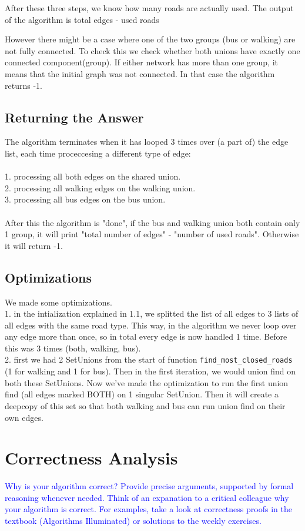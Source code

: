 \documentclass[a4paper]{article}
\newcommand{\instruction}[1]{\textcolor{blue}{#1}}
\begin{document}
After these three steps, we know how many roads are actually used.
The output of the algorithm is total edges - used roads

However there might be a case where one of the two groups (bus or walking) are not fully connected.
To check this we check whether both unions have exactly one connected component(group).
If either network has more than one group, it means that the initial graph was not connected.
In that case the algorithm returns -1.


\subsection{Returning the Answer}
The algorithm terminates when it has looped 3 times over (a part of) the edge list, each time proceccesing a different type of edge:
\\
\\
1. processing all both edges on the shared union.
\\
2. processing all walking edges on the walking union.
\\
3. processing all bus edges on the bus union.
\\
\\
After this the algorithm is "done", if the bus and walking union both contain only 1 group, it will print "total number of edges" - "number of used roads". Otherwise it will return -1.
\subsection{Optimizations}
We made some optimizations.\\1. in the intialization explained in 1.1, we splitted the list of all edges to 3 lists of all edges with the same road type. This way, in the algorithm we never loop over any edge more than once, so in total every edge is now handled 1 time. Before this was 3 times (both, walking, bus).
\\2. first we had 2 SetUnions from the start of function \texttt{find\_most\_closed\_roads} (1 for walking and 1 for bus). Then in the first iteration, we would union find on both these SetUnions. Now we've made the optimization to run the first union find (all edges marked BOTH) on 1 singular SetUnion. Then it will create a deepcopy of this set so that both walking and bus can run union find on their own edges.

\section{Correctness Analysis}
\instruction{Why is your algorithm correct? Provide precise arguments, supported by formal reasoning whenever needed. Think of an expanation to a critical colleague why your algorithm is correct. For examples, take a look at correctness proofs in the textbook (Algorithms Illuminated) or solutions to the weekly exercises.}
\end{document}
